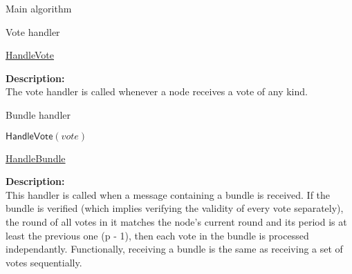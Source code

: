 \documentclass[10pt,a4paper]{article}
\begin{document}
\begin{section}{Main algorithm}
\begin{subsection}{Vote handler}
\begin{algorithm}[H]
\begin{algorithmic}[1]


            \EndIf

        \EndFunction
        \end{algorithmic}
        \caption{\underline{HandleVote}}
    \end{algorithm}
    
    
    \noindent \textbf{Description:}\\
The vote handler is called whenever a node receives a vote of any kind.

    
\end{subsection}


\begin{subsection}{Bundle handler}\label{ssect:HandleBundle}

    \begin{algorithm}[H]
        \begin{algorithmic}[1]

                    \State $\mathsf{HandleVote}(vote)$
                \EndFor
            \EndIf

        \EndFunction
        \end{algorithmic}
        \caption{\underline{HandleBundle}}
    \end{algorithm}
    
    
    \noindent \textbf{Description:}\\
This handler is called when a message containing a bundle is received.
If the bundle is verified (which implies verifying the validity of every vote separately),
the round of all votes in it matches the node's current round and its period is at least the previous one (p - 1), 
then each vote in the bundle is processed independantly.
Functionally, receiving a bundle is the same as receiving a set of votes sequentially.

\end{subsection}



\end{section}
\end{document}
